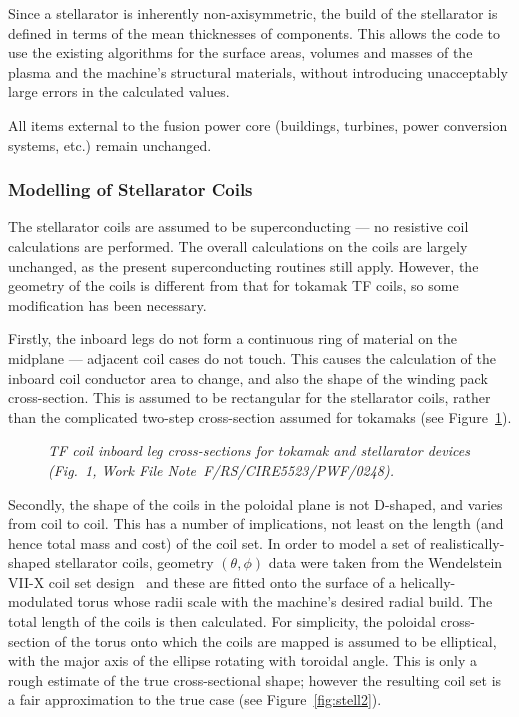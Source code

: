 Since a stellarator is inherently non-axisymmetric, the build of the \PS
stellarator is defined in terms of the mean thicknesses of components. This
allows the code to use the existing algorithms for the surface areas, volumes
and masses of the plasma and the machine's structural materials, without
introducing unacceptably large errors in the calculated values.

All items external to the fusion power core (buildings, turbines, power
conversion systems, etc.) remain unchanged.

\subsubsection{Modelling of Stellarator Coils}
The stellarator coils are assumed to be superconducting --- no resistive coil
calculations are performed.  The overall calculations on the coils are largely
unchanged, as the present superconducting routines still apply. However, the
geometry of the coils is different from that for tokamak TF coils, so some
modification has been necessary.

Firstly, the inboard legs do not form a continuous ring of material on the
midplane --- adjacent coil cases do not touch. This causes the calculation of
the inboard coil conductor area to change, and also the shape of the winding
pack cross-section. This is assumed to be rectangular for the stellarator
coils, rather than the complicated two-step cross-section assumed for tokamaks
(see Figure~\ref{fig:stell1}).

\begin{figure}
\vspace*{180mm}
\caption[tosh]{\it TF coil inboard leg cross-sections for tokamak and
stellarator devices (Fig.~1, Work File Note~F/RS/CIRE5523/PWF/0248).}
\label{fig:stell1}
\end{figure}

Secondly, the shape of the coils in the poloidal plane is not D-shaped, and
varies from coil to coil. This has a number of implications, not least on the
length (and hence total mass and cost) of the coil set. In order to model a
set of realistically-shaped stellarator coils, geometry $(\theta,\phi)$ data
were taken from the Wendelstein VII-X coil set design~\cite{W7X} and these are
fitted onto the surface of a helically-modulated torus whose radii scale with
the machine's desired radial build. The total length of the coils is then
calculated. For simplicity, the poloidal cross-section of the torus onto which
the coils are mapped is assumed to be elliptical, with the major axis of the
ellipse rotating with toroidal angle. This is only a rough estimate of the
true cross-sectional shape; however the resulting coil set is a fair
approximation to the true case (see Figure~\ref{fig:stell2}).

